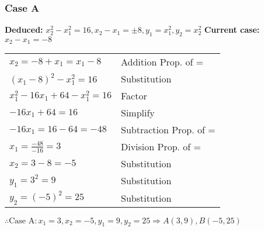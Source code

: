 \documentclass[mathserif]{beamer}
\begin{document}
	\begin{frame}
		\frametitle{Case A}
		
		\textbf{Deduced:} $x_2^2-x_1^2=16, x_2-x_1=\pm 8, y_1=x_1^2, y_2=x_2^2$\newline
		\textbf{Current case:} $x_2-x_1=-8$
		
		\begin{center}
		\begin{tabular}{l | l}
			$x_2=-8+x_1=x_1-8$ & Addition Prop. of = \\
			$(x_1-8)^2-x_1^2=16$ & Substitution \\
			$x_1^2-16x_1+64-x_1^2=16$ & Factor \\
			$-16x_1+64=16$ & Simplify \\
			$-16x_1=16-64=-48$ & Subtraction Prop. of = \\
			$x_1=\frac{-48}{-16}=3$ & Division Prop. of = \\
			$x_2=3-8=-5$ & Substitution \\
			$y_1=3^2=9$ & Substitution \\
			$y_2=(-5)^2=25$ & Substitution
		\end{tabular}
	\end{center}
		$\therefore \text{Case A}: x_1=3,x_2=-5,y_1=9,y_2=25 \Rightarrow A(3,9), B(-5,25)$
\end{frame}
\end{document}
